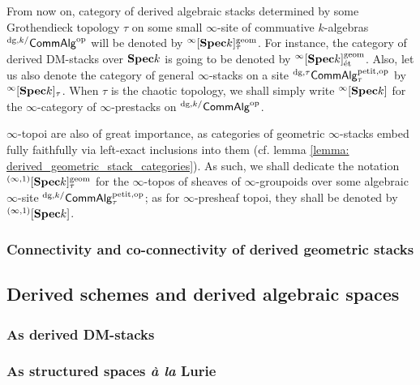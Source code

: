                 \begin{convention} \label{conv: derived_algebraic_stacks_notations}
                    From now on, category of derived algebraic stacks determined by some Grothendieck topology $\tau$ on some small $\infty$-site of commuative $k$-algebras ${}^{\mathrm{dg}, k/}\mathsf{Comm}\mathsf{Alg}^{\mathrm{op}}$ will be denoted by ${}^{\infty}[\mathbf{Spec} k]^{\mathrm{geom}}_{\tau}$. For instance, the category of derived DM-stacks over $\mathbf{Spec} k$ is going to be denoted by ${}^{\infty}[\mathbf{Spec} k]^{\mathrm{geom}}_{\mathrm{\acute{e}t}}$. Also, let us also denote the category of general $\infty$-stacks on a site ${}^{\mathrm{dg}, \tau}\mathsf{Comm}\mathsf{Alg}^{\mathrm{petit}, \mathrm{op}}_{\tau}$ by ${}^{\infty}[\mathbf{Spec} k]_{\tau}$. When $\tau$ is the chaotic topology, we shall simply write ${}^{\infty}[\mathbf{Spec} k]$ for the $\infty$-category of $\infty$-prestacks on ${}^{\mathrm{dg}, k/}\mathsf{Comm}\mathsf{Alg}^{\mathrm{op}}$.
                    
                    $\infty$-topoi are also of great importance, as categories of geometric $\infty$-stacks embed fully faithfully via left-exact inclusions into them (cf. lemma \ref{lemma: derived_geometric_stack_categories}). As such, we shall dedicate the notation ${}^{(\infty, 1)}[\mathbf{Spec} k]^{\mathrm{geom}}_{\tau}$ for the $\infty$-topos of sheaves of $\infty$-groupoids over some algebraic $\infty$-site ${}^{\mathrm{dg}, k/}\mathsf{Comm}\mathsf{Alg}_{\tau}^{\mathrm{petit}, \mathrm{op}}$; as for $\infty$-presheaf topoi, they shall be denoted by ${}^{(\infty, 1)}[\mathbf{Spec} k]$. 
                \end{convention}
            
            \subsubsection{Connectivity and co-connectivity of derived geometric stacks}
        
        \subsection{Derived schemes and derived algebraic spaces}
            \subsubsection{As derived DM-stacks}
            
            \subsubsection{As structured spaces \textit{\`a la} Lurie}
        
